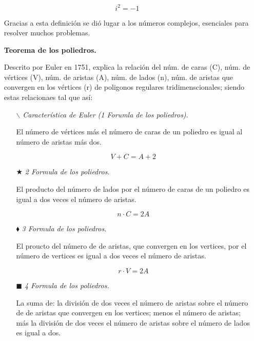 \documentclass[12pt,letterpaper]{article}
\begin{document}
\begin{itemize}
    $$i^{2}=-1$$

    Gracias a esta definición se dió lugar a los números complejos, esenciales para resolver muchos problemas.\newline
    
    \item[] \textbf{Teorema de los poliedros.}\newline
    
    Descrito por Euler en 1751, explica la relación del núm. de caras (C), núm. de vértices (V), núm. de aristas (A), núm. de lados (n), núm. de aristas que convergen en los vértices (r) de poligonos regulares tridimenscionales; siendo estas relacionaes tal que así:

        \begin{itemize}
        
            \item[$\backslash$] \textit{Característica de Euler (1 Forumla de los poliedros).}\newline

            El número de vértices más el número de caras de un poliedro es igual al número de aristas más dos.

            $$V+C=A+2$$
            
            \item[$\bigstar$] \textit{2 Formula de los poliedros.}\newline

            El producto del número de lados por el número de caras de un poliedro es igual a dos veces el número de aristas.
            
            $$n\cdot C=2A$$

            \item[$\blacklozenge$] \textit{3 Formula de los poliedros.}\newline

            El proucto del número de de aristas, que convergen en los vertices, por el número de vertices es igual a dos veces el número de aristas.
            
            $$r\cdot V=2A$$
            
            \item[$\blacksquare$] \textit{4 Formula de los poliedros.}\newline

            La suma de: la división de dos veces el número de aristas sobre el número de de aristas que convergen en los vertices; menos el número de aristas; más la división de dos veces el número de aristas sobre el número de lados es igual a dos.
            

\end{itemize}
\end{itemize}
\end{document}
